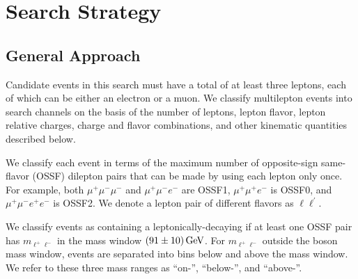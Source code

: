 \chapter{Search Strategy}
\label{chap:Strategy}

\section{General Approach}
\label{sec:Strategy/general}

Candidate events in this search must have a total of at least three leptons, each of which can be either an electron or a muon. We classify multilepton events into search channels on the basis of the number of leptons, lepton flavor, lepton relative charges, charge and flavor combinations, and other kinematic quantities described below.

We classify each event in terms of the maximum number of opposite-sign same-flavor (OSSF) dilepton pairs that can be made by using each lepton only once. For example, both $\mu^+\mu^-\mu^-$ and $\mu^+\mu^-e^-$ are OSSF1, $\mu^+\mu^+e^-$ is OSSF0, and $\mu^+\mu^-e^+e^-$ is OSSF2. We denote a lepton pair of different flavors as $\ell\ell^\prime$.

We classify events as containing a leptonically-decaying \Z if at least one OSSF pair has $m_{\ell^+\ell^-}$ in the \Z mass window $(91 \pm 10)\,\text{Ge\hspace{-.08em}V}$. For $m_{\ell^+\ell^-}$ outside the \Z boson mass window, events are separated into bins below and above the \Z mass window. We refer to these three mass ranges as ``on-\Z'', ``below-\Z'', and ``above-\Z''.

